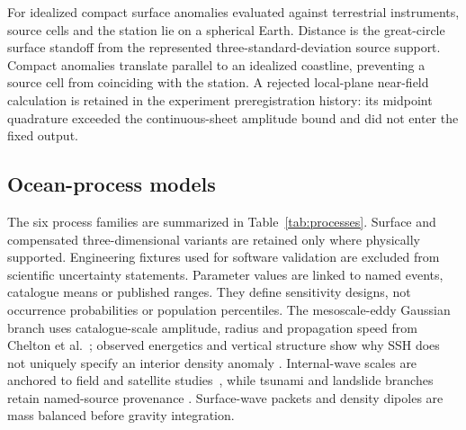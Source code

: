 \documentclass[11pt]{article}
\begin{document}
For idealized compact surface anomalies evaluated against terrestrial
instruments, source cells and the station lie on a spherical Earth. Distance is
the great-circle surface standoff from the represented three-standard-deviation
source support. Compact anomalies translate parallel to an idealized coastline,
preventing a source cell from coinciding with the station. A rejected local-plane
near-field calculation is retained in the experiment preregistration history:
its midpoint quadrature exceeded the continuous-sheet amplitude bound and did
not enter the fixed output.

\subsection{Ocean-process models}
The six process families are summarized in Table~\ref{tab:processes}. Surface
and compensated three-dimensional variants are retained only where physically
supported. Engineering fixtures used for software validation are excluded from
scientific uncertainty statements. Parameter values are linked to named events,
catalogue means or published ranges. They define sensitivity designs, not
occurrence probabilities or population percentiles. The mesoscale-eddy Gaussian
branch uses catalogue-scale amplitude, radius and propagation speed from
Chelton et al.~\cite{Chelton2011}; observed energetics and vertical structure
show why SSH does not uniquely specify an interior density anomaly
\cite{Luecke2017,Li2022Eddy,George2021}. Internal-wave scales are anchored to
field and satellite studies~\cite{LiFarmer2011,Huang2016,Zhao2016,Rainville2013},
while tsunami and landslide branches retain named-source provenance
\cite{Tang2012,Lovholt2017,Kim2019}. Surface-wave packets and density dipoles
are mass balanced before gravity integration.
\end{document}
